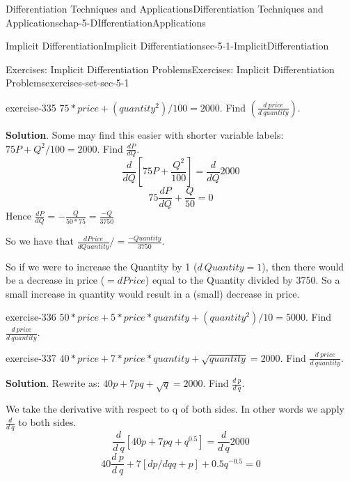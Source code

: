\documentclass[oneside,10pt,]{book}
\numberwithin{equation}{section}
\begin{document}
\begin{chapterptx}{Differentiation Techniques and Applications}{}{Differentiation Techniques and Applications}{}{}{chap-5-DIfferentiationApplications}
\begin{sectionptx}{Implicit Differentiation}{}{Implicit Differentiation}{}{}{sec-5-1-ImplicitDifferentiation}
\begin{exercises-subsection-numberless}{Exercises: Implicit Differentiation Problems}{}{Exercises: Implicit Differentiation Problems}{}{}{exercises-set-sec-5-1}
\begin{divisionexercise}{5}{}{}{exercise-335}%
\hypertarget{p-1907}{}%
\(75*price+(quantity^2)/100=2000\).	Find \(\left(\frac{d\ price}{d\ quantity}\right)\).%
\par\smallskip%
\noindent\textbf{Solution}.\hypertarget{solution-168}{}\quad%
\hypertarget{p-1908}{}%
Some may find this easier with shorter variable labels: \(75P+Q^2/100=2000\).   Find \(\frac{dP}{dQ}\).%
%
\begin{equation*}
\frac{d}{dQ}  [75P+\frac{Q^2}{100}]=\frac{d}{dQ}  2000
\end{equation*}
%
\begin{equation*}
75  \frac{dP}{dQ}+\frac{Q}{50}=0
\end{equation*}
\hypertarget{p-1909}{}%
Hence    \(\frac{dP}{dQ}=-  \frac{Q}{50*75}= \frac{-Q}{3750}\)%
\par
\hypertarget{p-1910}{}%
So we have that \(\frac{dPrice}{dQuantity}/= \frac{-Quantity}{3750}\).%
\par
\hypertarget{p-1911}{}%
So if we were to increase the Quantity by 1 (\(d\ Quantity = 1\)), then there would be a decrease in price (\(= d Price\)) equal to the Quantity divided by 3750. So a small increase in quantity would result in a (small) decrease in price.%
\end{divisionexercise}%
\begin{divisionexercise}{6}{}{}{exercise-336}%
\hypertarget{p-1912}{}%
\(50*price+5*price*quantity+(quantity^2)/10=5000\).	Find \(\frac{d\ price}{d\ quantity}\).%
\end{divisionexercise}%
\begin{divisionexercise}{7}{}{}{exercise-337}%
\hypertarget{p-1913}{}%
\(40*price+7*price*quantity+\sqrt{quantity}=2000\).	Find \(\frac{d\ price}{d\ quantity}\).%
\par\smallskip%
\noindent\textbf{Solution}.\hypertarget{solution-169}{}\quad%
\hypertarget{p-1914}{}%
Rewrite as:   \(40p+7pq+\sqrt{q}=2000\).  Find \(\frac{d\ p}{d\ q}\).%
\par
\hypertarget{p-1915}{}%
We take the derivative with respect to q of both sides. In other words we apply \(\frac{d}{d\ q}\) to both sides.%
%
\begin{equation*}
\frac{d}{d\ q}  [40p+7pq+q^{0.5} ]=\frac{d}{d\ q} 2000
\end{equation*}
%
\begin{equation*}
40 \frac{d\ p}{d\ q}+7[dp/dq  q+p]+0.5 q^{-0.5}=0
\end{equation*}
%
\begin{equation*}

\end{equation*}
\end{divisionexercise}
\end{exercises-subsection-numberless}
\end{sectionptx}
\end{chapterptx}
\end{document}

